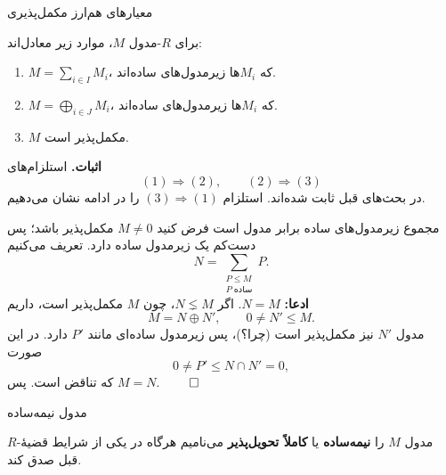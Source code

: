 \begin{frame}[t]{معیارهای هم‌ارز مکمل‌پذیری}
    \label{lec06:semisimple-equivalences}
    \begin{theorem}
        برای \(R\)-مدول \(M\)، موارد زیر معادل‌اند:
        \begin{enumerate}
            \item \(M=\sum_{i\in I}M_i\)، که \(M_i\)ها زیرمدول‌های ساده‌اند.
            \item \(M=\bigoplus_{i\in J}M_i\)، که \(M_i\)ها زیرمدول‌های ساده‌اند.
            \item \(M\) مکمل‌پذیر است.
        \end{enumerate}
    \end{theorem}
    \textbf{اثبات.}
    استلزام‌های
    \[
        (1)\Longrightarrow(2),\qquad(2)\Longrightarrow(3)
    \]
    در بحث‌های قبل ثابت شده‌اند.
    استلزام \((3)\Longrightarrow(1)\) را در ادامه نشان می‌دهیم.
\end{frame}

\begin{frame}[t]{مجموع زیرمدول‌های ساده برابر مدول است}
    \label{lec06:sum-of-all-simple-submodules}
    فرض کنید \(M\neq0\) مکمل‌پذیر باشد؛ پس دست‌کم یک زیرمدول ساده دارد.
    تعریف می‌کنیم
    \[
        N=\sum_{\substack{P\leqslant M\\P\;\text{ساده}}}P.
    \]
    \textbf{ادعا:} \(N=M\).
    اگر \(N\lneq M\)، چون \(M\) مکمل‌پذیر است، داریم
    \[
        M=N\oplus N',\qquad 0\neq N'\leqslant M.
    \]
    مدول \(N'\) نیز مکمل‌پذیر است (چرا؟)، پس زیرمدول ساده‌ای مانند \(P'\) دارد.
    در این صورت
    \[
        0\neq P'\leqslant N\cap N'=0,
    \]
    که تناقض است. پس \(M=N\).
    \hfill\(\qed\)
\end{frame}

\begin{frame}[t]{مدول نیمه‌ساده}
    \label{lec06:semisimple-module-definition}
    \begin{definition}
        \(R\)-مدول \(M\) را \textbf{نیمه‌ساده} یا \textbf{کاملاً تحویل‌پذیر}
        می‌نامیم هرگاه در یکی از شرایط قضیهٔ قبل صدق کند.
    \end{definition}
\end{frame}

